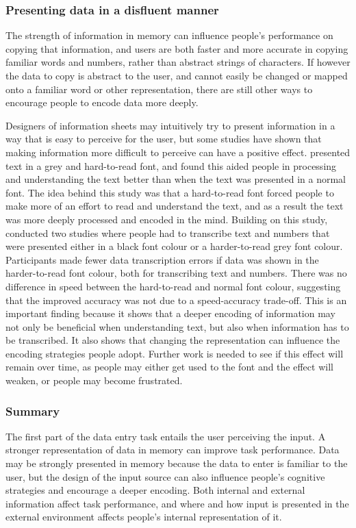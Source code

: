 \documentclass[11pt,oneside]{report}
\begin{document}
\subsubsection{Presenting data in a disfluent manner}
The strength of information in memory can influence people's performance on copying that information, and users are both faster and more accurate in copying familiar words and numbers, rather than abstract strings of characters. If however the data to copy is abstract to the user, and cannot easily be changed or mapped onto a familiar word or other representation, there are still other ways to encourage people to encode data more deeply. 

Designers of information sheets may intuitively try to present information in a way that is easy to perceive for the user, but some studies have shown that making information more difficult to perceive can have a positive effect.
\citet{Diemand-Yauman2011} presented text in a grey and hard-to-read font, and found this aided people in processing and understanding the text better than when the text was presented in a normal font. The idea behind this study was that a hard-to-read font forced people to make more of an effort to read and understand the text, and as a result the text was more deeply processed and encoded in the mind. Building on this study, \citet{Soboczenski2013} conducted two studies where people had to transcribe text and numbers that were presented either in a black font colour or a harder-to-read grey font colour. Participants made fewer data transcription errors if data was shown in the harder-to-read font colour, both for transcribing text and numbers. There was no difference in speed between the hard-to-read and normal font colour, suggesting that the improved accuracy was not due to a speed-accuracy trade-off. This is an important finding because it shows that a deeper encoding of information may not only be beneficial when understanding text, but also when information has to be transcribed. It also shows that changing the representation can influence the encoding strategies people adopt.
Further work is needed to see if this effect will remain over time, as people may either get used to the font and the effect will weaken, or people may become frustrated. 

\subsubsection{Summary}
The first part of the data entry task entails the user perceiving the input.  A stronger representation of data in memory can improve task performance. Data may be strongly presented in memory because the data to enter is familiar to the user, but the design of the input source can also influence people's cognitive strategies and encourage a deeper encoding. Both internal and external information affect task performance, and where and how input is presented in the external environment affects people's internal representation of it. 
\end{document}
